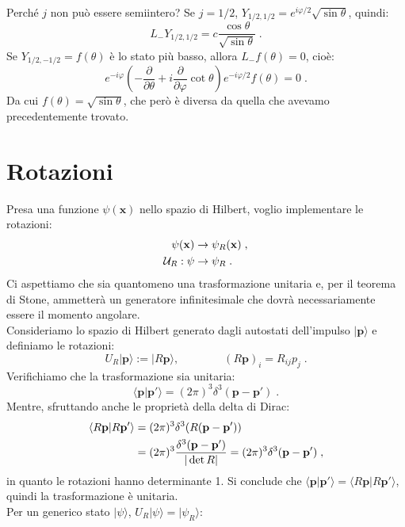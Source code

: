 \documentclass[12pt,a4paper]{report}
\theoremstyle{definition}
\numberwithin{equation}{section}
\newcommand{\bra}{\langle}
\newcommand{\ket}{\rangle}
\begin{document}
Perché $j$ non può essere semiintero? Se $j=1/2$, $Y_{1/2,1/2}=e^{i\varphi/2}\sqrt{\sin\theta}$, quindi:
\begin{equation}
L_-Y_{1/2,1/2}=c\frac{\cos\theta}{\sqrt{\sin\theta}}\;.
\end{equation}
Se $Y_{1/2,-1/2}=f(\theta)$ è lo stato più basso, allora $L_-f(\theta)=0$, cioè:
\begin{equation}
e^{-i\varphi}\left(-\frac{\partial}{\partial\theta}+i\frac{\partial}{\partial\varphi}\cot\theta\right)e^{-i\varphi/2}f(\theta)=0\;.
\end{equation}
Da cui $f(\theta)=\sqrt{\sin\theta}$, che però è diversa da quella che avevamo precedentemente trovato.
\section{Rotazioni}
Presa una funzione $\psi(\mathbf{x})$ nello spazio di Hilbert, voglio implementare le rotazioni:
\begin{align}
\psi(\mathbf{x}) &\to \psi_R(\mathbf{x}) \notag\;, \\
\mathcal{U}_R:\psi &\to \psi_R\;.
\end{align}
Ci aspettiamo che sia quantomeno una trasformazione unitaria e, per il teorema di Stone, ammetterà un generatore infinitesimale che dovrà necessariamente essere il momento angolare. \\
Consideriamo lo spazio di Hilbert generato dagli autostati dell'impulso $|\mathbf{p}\ket$ e definiamo le rotazioni:
\begin{equation}
U_R|\mathbf{p}\ket:=|R\mathbf{p}\ket, \qquad \qquad (R\mathbf{p})_i=R_{ij}p_j\;.
\end{equation}
Verifichiamo che la trasformazione sia unitaria:
\begin{equation}
\bra \mathbf{p}|\mathbf{p}'\ket=(2\pi)^3\delta^3(\mathbf{p}-\mathbf{p}')\;.
\end{equation}
Mentre, sfruttando anche le proprietà della delta di Dirac:
\begin{align}
\bra R\mathbf{p}|R\mathbf{p}'\ket &= (2\pi)^3\delta^3(R(\mathbf{p}-\mathbf{p}'))  \notag \\
&= (2\pi)^3 \frac{\delta^3(\mathbf{p}-\mathbf{p}')}{|\det R|}=(2\pi)^3\delta^3(\mathbf{p}-\mathbf{p}')\;,
\end{align}
in quanto le rotazioni hanno determinante 1. Si conclude che $\bra \mathbf{p}|\mathbf{p}'\ket=\bra R\mathbf{p}|R\mathbf{p}'\ket$, quindi la trasformazione è unitaria. \\
Per un generico stato $|\psi\ket$, $U_R|\psi\ket=|\psi_R\ket$:
\end{document}
